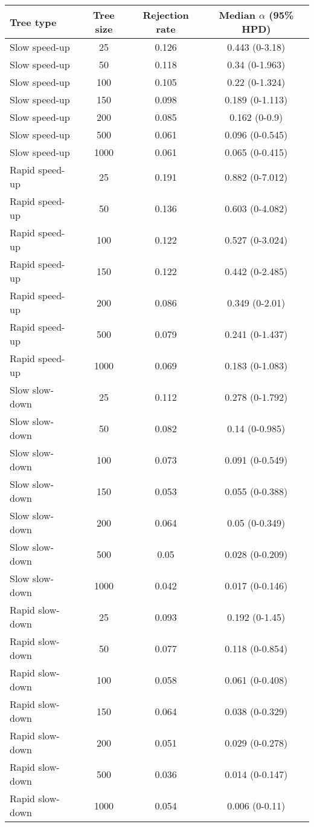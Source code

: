 \begin{tabular}{lccc}
  \hline
  \textbf{Tree type} & \textbf{Tree size} & \textbf{Rejection rate}  & \textbf{Median $\alpha$ (95\% HPD)}  \\
  \hline
  Slow speed-up & 25  & 0.126 & 0.443 (0-3.18)  \\
  Slow speed-up & 50  & 0.118 & 0.34 (0-1.963)  \\
  Slow speed-up & 100 & 0.105 & 0.22 (0-1.324)  \\
  Slow speed-up & 150 & 0.098 & 0.189 (0-1.113) \\
  Slow speed-up & 200 & 0.085 & 0.162 (0-0.9) \\
  Slow speed-up & 500 & 0.061 & 0.096 (0-0.545) \\
  Slow speed-up & 1000  & 0.061 & 0.065 (0-0.415) \\
  \hline
  Rapid speed-up  & 25  & 0.191 & 0.882 (0-7.012) \\
  Rapid speed-up  & 50  & 0.136 & 0.603 (0-4.082) \\
  Rapid speed-up  & 100 & 0.122 & 0.527 (0-3.024) \\
  Rapid speed-up  & 150 & 0.122 & 0.442 (0-2.485) \\
  Rapid speed-up  & 200 & 0.086 & 0.349 (0-2.01)  \\
  Rapid speed-up  & 500 & 0.079 & 0.241 (0-1.437) \\
  Rapid speed-up  & 1000  & 0.069 & 0.183 (0-1.083) \\
  \hline
  Slow slow-down  & 25  & 0.112 & 0.278 (0-1.792) \\
  Slow slow-down  & 50  & 0.082 & 0.14 (0-0.985)  \\
  Slow slow-down  & 100 & 0.073 & 0.091 (0-0.549) \\
  Slow slow-down  & 150 & 0.053 & 0.055 (0-0.388) \\
  Slow slow-down  & 200 & 0.064 & 0.05 (0-0.349)  \\
  Slow slow-down  & 500 & 0.05  & 0.028 (0-0.209) \\
  Slow slow-down  & 1000  & 0.042 & 0.017 (0-0.146) \\
  \hline
  Rapid slow-down & 25  & 0.093 & 0.192 (0-1.45)  \\
  Rapid slow-down & 50  & 0.077 & 0.118 (0-0.854) \\
  Rapid slow-down & 100 & 0.058 & 0.061 (0-0.408) \\
  Rapid slow-down & 150 & 0.064 & 0.038 (0-0.329) \\
  Rapid slow-down & 200 & 0.051 & 0.029 (0-0.278) \\
  Rapid slow-down & 500 & 0.036 & 0.014 (0-0.147) \\
  Rapid slow-down & 1000  & 0.054 & 0.006 (0-0.11)  \\
  \hline
\end{tabular}